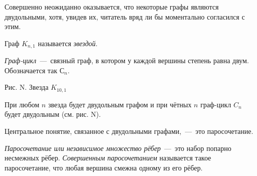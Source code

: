 \begin{paracol}{2}
	Совершенно неожиданно оказывается, что некоторые графы являются двудольными, хотя, увидев их, читатель вряд ли бы моментально согласился с этим.

\begin{definition}
	Граф $K_{n, 1}$ называется \emph{звездой}.
\end{definition}
\begin{definition}
	\emph{Граф-цикл}~---~связный граф, в котором у каждой вершины степень равна двум. Обозначается так $С_n$.
\end{definition}

\switchcolumn
 
\begin{center}

	\small Рис. N. Звезда $K_{10, 1}$
\end{center}\end{paracol}

	При любом $n$ звезда будет двудольным графом и при чётных $n$ граф-цикл $C_n$ будет двудольным (см. рис. N).


	Центральное понятие, связанное с двудольными графами,~---~это паросочетание.
	
\begin{definition}
	\emph{Паросочетание или независимое множество рёбер}~---~это набор попарно несмежных рёбер. \emph{Совершенным паросочетанием} называется такое паросочетание, что любая вершина смежна одному из его рёбер. 
\end{definition}

